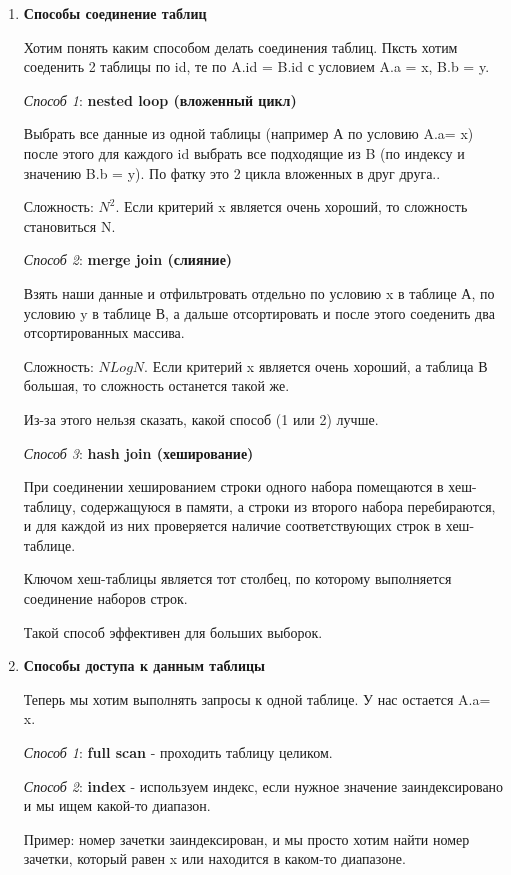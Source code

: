 \begin{enumerate}
    \item \textbf{Способы соединение таблиц }

Хотим понять каким способом делать соединения таблиц. Пксть хотим соеденить 2 таблицы по id, те по A.id = B.id с условием A.a = x, B.b = y.

\textit{Способ 1}: \textbf{nested loop (вложенный цикл)}

Выбрать все данные из одной таблицы (например А по условию A.a= x) после этого для каждого id выбрать все подходящие из B (по индексу и значению B.b = y). По фатку это 2 цикла вложенных в друг друга..

Сложность: $N^2$. Если критерий x является очень хороший, то сложность становиться N. 

\textit{Способ 2}: \textbf{merge join (слияние)}

Взять наши данные и отфильтровать отдельно по условию x в таблице А, по условию y в таблице В, а дальше отсортировать и после этого соеденить два отсортированных массива.

Сложность: $NLogN$. Если критерий x является очень хороший, а таблица В большая, то сложность останется такой же. 

Из-за этого нельзя сказать, какой способ (1 или 2) лучше. 

\textit{Способ 3}: \textbf{hash join (хеширование)}

При соединении хешированием строки одного набора помещаются в
хеш-таблицу, содержащуюся в памяти, а строки из второго набора
перебираются, и для каждой из них проверяется наличие
соответствующих строк в хеш-таблице.

Ключом хеш-таблицы является тот столбец, по которому выполняется
соединение наборов строк.

Такой способ эффективен для больших выборок. 

\item  \textbf{Способы доступа к данным таблицы}

Теперь мы хотим выполнять запросы к одной таблице. У нас остается A.a= x. 

\textit{Способ 1}: \textbf{full scan} - проходить таблицу целиком. 

\textit{Способ 2}: \textbf{index} - используем индекс, если нужное значение заиндексировано и мы ищем какой-то диапазон. 

Пример: номер зачетки заиндексирован, и мы просто хотим найти номер зачетки, который равен x или находится в каком-то диапазоне. 


\end{enumerate}
